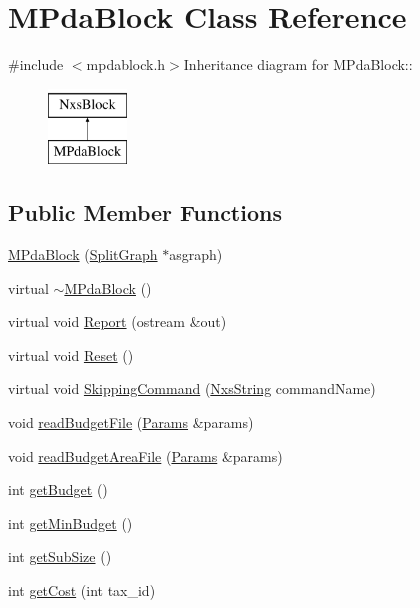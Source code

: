 \hypertarget{classMPdaBlock}{
\section{MPdaBlock Class Reference}
\label{classMPdaBlock}
}


{\ttfamily \#include $<$mpdablock.h$>$}Inheritance diagram for MPdaBlock::\begin{figure}[H]
\begin{center}
\leavevmode
\includegraphics[height=2cm]{classMPdaBlock}
\end{center}
\end{figure}
\subsection*{Public Member Functions}
\begin{DoxyCompactItemize}
\item 
\hyperlink{classMPdaBlock_ae7836b51af1d605dc14372c86b0e996f}{MPdaBlock} (\hyperlink{classSplitGraph}{SplitGraph} $\ast$asgraph)
\item 
virtual \hyperlink{classMPdaBlock_a89cff585f4dcb2f8a2ee1fd6a1c325b0}{$\sim$MPdaBlock} ()
\item 
virtual void \hyperlink{classMPdaBlock_a2ff807bfbacc967eabb5dd643c557fb4}{Report} (ostream \&out)
\item 
virtual void \hyperlink{classMPdaBlock_aba6f6df591c6d1938470e1d13cd9dbef}{Reset} ()
\item 
virtual void \hyperlink{classMPdaBlock_a8fdbc4b20dbfc882e40438a0d8903702}{SkippingCommand} (\hyperlink{classNxsString}{NxsString} commandName)
\item 
void \hyperlink{classMPdaBlock_a0ce085cb000043bf029ef69abf4a97da}{readBudgetFile} (\hyperlink{structParams}{Params} \&params)
\item 
void \hyperlink{classMPdaBlock_af0f2d47828ca74a66567e2655ceb3c83}{readBudgetAreaFile} (\hyperlink{structParams}{Params} \&params)
\item 
int \hyperlink{classMPdaBlock_a670ae262a9f283604cdb289a54f3abd5}{getBudget} ()
\item 
int \hyperlink{classMPdaBlock_a6a41191883550a8b986a2a6e43617ca5}{getMinBudget} ()
\item 
int \hyperlink{classMPdaBlock_a551b1f35390ddf325216d2a70f8adb3f}{getSubSize} ()
\item 
int \hyperlink{classMPdaBlock_a1055777b11e0944b8ca18935f3af6f2e}{getCost} (int tax\_\-id)
\end{DoxyCompactItemize}
